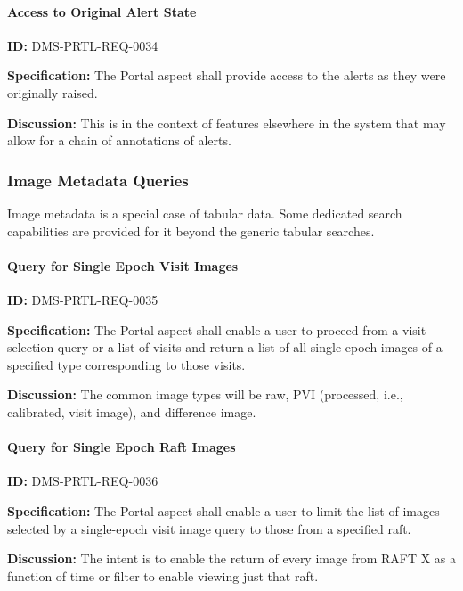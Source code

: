 \documentclass[SE,toc]{lsstdoc}
\begin{document}
\paragraph{Access to Original Alert State}\hfill  %

\label{DMS-PRTL-REQ-0034}
\textbf{ID:} DMS-PRTL-REQ-0034

\textbf{Specification:}
The Portal aspect shall provide access to the alerts as they were originally raised.

\textbf{Discussion:}
This is in the context of features elsewhere in the system that may allow for a chain of annotations of alerts.

\subsubsection{Image Metadata Queries}

Image metadata is a special case of tabular data.  Some dedicated search capabilities are provided for it beyond the generic tabular searches.

\paragraph{Query for Single Epoch Visit Images}\hfill  %

\label{DMS-PRTL-REQ-0035}
\textbf{ID:} DMS-PRTL-REQ-0035

\textbf{Specification:}
The Portal aspect shall enable a user to proceed from a visit-selection query or a list of visits and return a list of all single-epoch images of a specified type corresponding to those visits.

\textbf{Discussion:}
The common image types will be raw, PVI (processed, i.e., calibrated, visit image), and difference image.

\paragraph{Query for Single Epoch Raft Images}\hfill  %

\label{DMS-PRTL-REQ-0036}
\textbf{ID:} DMS-PRTL-REQ-0036

\textbf{Specification:}
The Portal aspect shall enable a user to limit the list of images selected by a single-epoch visit image query to those from a specified raft.

\textbf{Discussion:}
The intent is to enable the return of every image from RAFT X as a function of time or filter to enable viewing just that raft.
\end{document}
